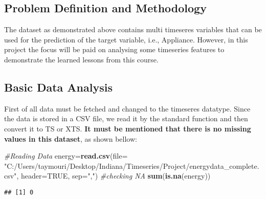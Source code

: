 \documentclass[]{article}
\newenvironment{Shaded}{\begin{snugshade}}{\end{snugshade}}
\newcommand{\KeywordTok}[1]{\textcolor[rgb]{0.13,0.29,0.53}{\textbf{#1}}}
\newcommand{\DataTypeTok}[1]{\textcolor[rgb]{0.13,0.29,0.53}{#1}}
\newcommand{\DecValTok}[1]{\textcolor[rgb]{0.00,0.00,0.81}{#1}}
\newcommand{\StringTok}[1]{\textcolor[rgb]{0.31,0.60,0.02}{#1}}
\newcommand{\CommentTok}[1]{\textcolor[rgb]{0.56,0.35,0.01}{\textit{#1}}}
\newcommand{\OtherTok}[1]{\textcolor[rgb]{0.56,0.35,0.01}{#1}}
\newcommand{\OperatorTok}[1]{\textcolor[rgb]{0.81,0.36,0.00}{\textbf{#1}}}
\newcommand{\NormalTok}[1]{#1}
\begin{document}
\subsection{Problem Definition and
Methodology}\label{problem-definition-and-methodology}

The dataset as demonstrated above contains multi timeseres variables
that can be used for the prediction of the target variable, i.e.,
Appliance. However, in this project the focus will be paid on analysing
some timeseries features to demonstrate the learned lessons from this
course.

\subsection{Basic Data Analysis}\label{basic-data-analysis}

First of all data must be fetched and changed to the timeseres datatype.
Since the data is stored in a CSV file, we read it by the standard
function and then convert it to TS or XTS. \textbf{It must be mentioned
that there is no missing values in this dataset}, as shown bellow:

\begin{Shaded}
\begin{Highlighting}[]
\CommentTok{#Reading Data}
\NormalTok{energy=}\KeywordTok{read.csv}\NormalTok{(}\DataTypeTok{file=} \StringTok{"C:/Users/taymouri/Desktop/Indiana/Timeseries/Project/energydata_complete.csv"}\NormalTok{, }\DataTypeTok{header=}\OtherTok{TRUE}\NormalTok{, }\DataTypeTok{sep=}\StringTok{","}\NormalTok{)}
\CommentTok{#checking NA}
\KeywordTok{sum}\NormalTok{(}\KeywordTok{is.na}\NormalTok{(energy))}
\end{Highlighting}
\end{Shaded}

\begin{verbatim}
## [1] 0
\end{verbatim}

\begin{Shaded}
\end{Shaded}
\end{document}
